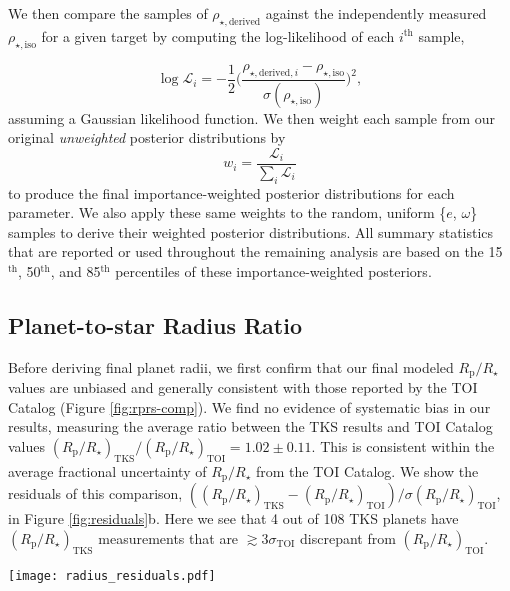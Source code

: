 \documentclass[twocolumn]{aastex63}
\begin{document}
We then compare the samples of $\rho_{\star, \textrm{derived}}$ against the independently measured $\rho_{\star, \textrm{iso}}$ for a given target by computing the log-likelihood of each $i^\textrm{th}$ sample,

%
\begin{equation}
\label{eq:log-like}
    \log \mathcal{L}_i = -\frac{1}{2}\Big(\frac{\rho_{\star, \textrm{derived}, i} - \rho_{\star, \textrm{iso}}}{\sigma(\rho_{\star, \textrm{iso}})}\Big)^2,
\end{equation}
%
assuming a Gaussian likelihood function. We then weight each sample from our original \textit{unweighted} posterior distributions by
%
\begin{equation}
\label{eq:weights}
    w_i = \frac{\mathcal{L}_i}{\sum_i \mathcal{L}_i}
\end{equation}
%
to produce the final importance-weighted posterior distributions for each parameter. We also apply these same weights to the random, uniform \{$e$, $\omega$\} samples to derive their weighted posterior distributions. All summary statistics that are reported or used throughout the remaining analysis are based on the 15$^\textrm{th}$, 50$^\textrm{th}$, and 85$^\textrm{th}$ percentiles of these importance-weighted posteriors.

\subsection{Planet-to-star Radius Ratio}
\label{sec:rprs}

Before deriving final planet radii, we first confirm that our final modeled $R_\textrm{p}/R_\star$ values are unbiased and generally consistent with those reported by the TOI Catalog (Figure \ref{fig:rprs-comp}). We find no evidence of systematic bias in our results, measuring the average ratio between the TKS results and TOI Catalog values $(R_\textrm{p}/R_\star)_\textrm{TKS} / (R_\textrm{p}/R_\star)_\textrm{TOI} = 1.02 \pm 0.11$. This is consistent within the average fractional uncertainty of $R_\textrm{p}/R_\star$ from the TOI Catalog. We show the residuals of this comparison, $((R_\textrm{p}/R_{\star})_\textrm{TKS} - (R_\textrm{p}/R_{\star})_\textrm{TOI})/\sigma(R_\textrm{p}/R_{\star})_\textrm{TOI}$, in Figure \ref{fig:residuals}b. Here we see that 4 out of 108 TKS planets have $(R_\textrm{p}/R_{\star})_\textrm{TKS}$ measurements that are $\gtrsim$3$\sigma_\textrm{TOI}$ discrepant from $(R_\textrm{p}/R_{\star})_\textrm{TOI}$.

\begin{figure*}[ht]
\centering
\texttt{[image: radius\_residuals.pdf]}
\caption{Residuals of (a) stellar radius $R_\star$, (b) planet-to-star radius ratio $R_\textrm{p}/R_\star$, and (c) planet radius  $R_\textrm{p}$ between our results and the TOI Catalog measurements (i.e. residual = $(R_{\star, \textrm{TKS}} - R_{\star, \textrm{TOI}})/\sigma(R_{\star, \textrm{TOI}})$). Dashed vertical lines show the $15^\textrm{th}$, $50^\textrm{th}$, and $85^\textrm{th}$ percentiles of each distribution of residuals.}
\label{fig:residuals}
\end{figure*}
\end{document}
